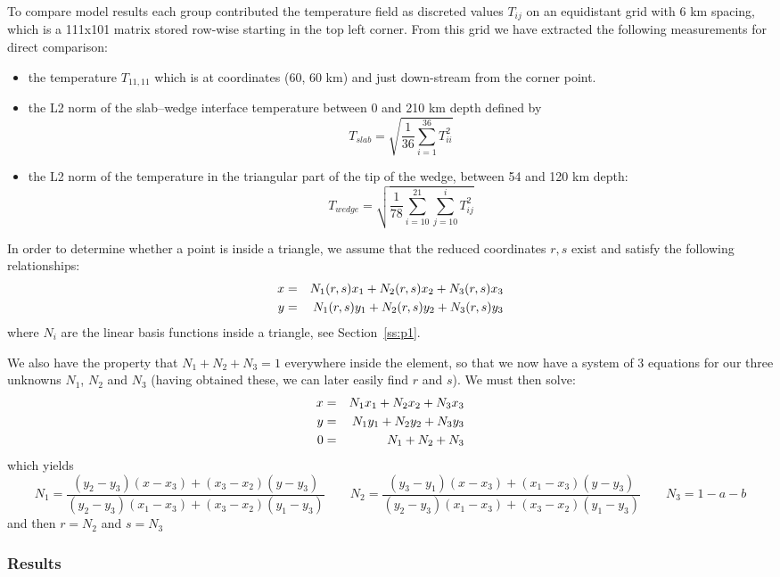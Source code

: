 To compare model results each
group contributed the temperature field as discreted values $T_{ij}$ on
an equidistant grid with 6 km spacing, which is a 111x101 matrix
stored row-wise starting in the top left corner. From this grid we
have extracted the following measurements for direct comparison:
\begin{itemize}
\item the temperature $T_{11,11}$ which is at coordinates (60, 60 km) and
just down-stream from the corner point.
\item the L2 norm of the slab–wedge interface temperature between
0 and 210 km depth defined by
\[
T_{slab} = \sqrt{\frac{1}{36} \sum_{i=1}^{36} T_{ii}^2  }
\]
\item 
the L2 norm of the temperature in the triangular part of the
tip of the wedge, between 54 and 120 km depth:
\[
T_{wedge} = \sqrt{ \frac{1}{78} \sum_{i=10}^{21} \sum_{j=10}^i T_{ij}^2   }
\]
\end{itemize}


In order to determine whether a point is inside a triangle, we assume that 
the reduced coordinates $r,s$ exist and satisfy the following 
relationships:
\begin{eqnarray}
x &=& N_1(r,s) x_1 + N_2(r,s) x_2 + N_3(r,s) x_3 \nonumber\\  
y &=& N_1(r,s) y_1 + N_2(r,s) y_2 + N_3(r,s) y_3 \nonumber
\end{eqnarray}
where $N_i$ are the linear basis functions inside a triangle, see Section~\ref{ss:p1}.

We also have the property that $N_1+N_2+N_3=1$ everywhere inside the element, so that 
we now have a system of 3 equations for our three unknowns $N_1$, $N_2$ and $N_3$ (having
obtained these, we can later easily find $r$ and $s$).
We must then solve:
\begin{eqnarray}
x &=& N_1 x_1 + N_2 x_2 + N_3 x_3 \nonumber\\  
y &=& N_1 y_1 + N_2 y_2 + N_3 y_3 \nonumber\\
0 &=& N_1+N_2+N_3 \nonumber
\end{eqnarray}
which yields
\[
N_1=\frac{(y_2 - y_3)(x - x_3) + (x_3 - x_2)(y - y_3)}{(y_2 - y_3)(x_1 - x_3) + (x_3 - x_2)(y_1 - y_3)}
\qquad
N_2=\frac{(y_3 - y_1)(x - x_3) + (x_1 - x_3)(y - y_3)}{(y_2 - y_3)(x_1 - x_3) + (x_3 - x_2)(y_1 - y_3)}
\qquad
N_3=1-a-b
\]
and then $r=N_2$ and $s=N_3$

\subsubsection*{Results}


